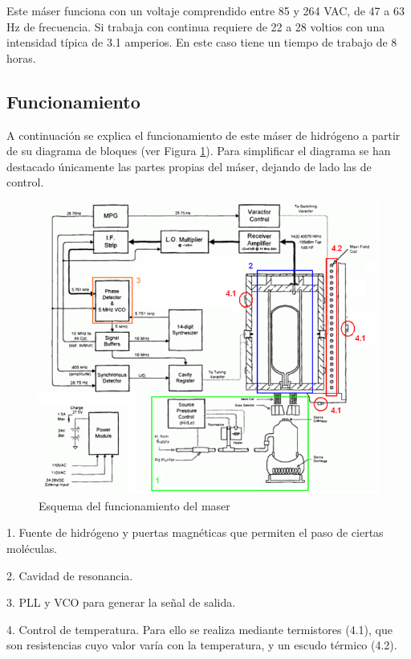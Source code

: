 Este m\'aser funciona con un voltaje comprendido entre 85 y 264 VAC, de 47 a 63 Hz de frecuencia. Si trabaja con continua requiere de 22 a 28 voltios con una intensidad típica de 3.1 amperios. En este caso tiene un tiempo de trabajo de 8 horas.

\subsection{Funcionamiento}

A continuaci\'on se explica el funcionamiento de este m\'aser de hidr\'ogeno a partir de su diagrama de bloques (ver Figura  \ref{fig:maser_desglosado}). Para simplificar el diagrama se han destacado \'unicamente las partes propias del m\'aser, dejando de lado las de control. 

\begin{figure}[hb!!!]
 \centering
 \includegraphics[width=\textwidth]{./Utils/maser_desglosado.png}
 \caption{Esquema del funcionamiento del maser}
 \label{fig:maser_desglosado}
\end{figure}

1. Fuente de hidrógeno y puertas magnéticas que permiten el paso de ciertas moléculas.

2. Cavidad de resonancia.

3. PLL y VCO para generar la señal de salida.

4. Control de temperatura. Para ello se realiza mediante termistores (4.1), que son resistencias cuyo valor varía con la temperatura, y un escudo térmico (4.2).


